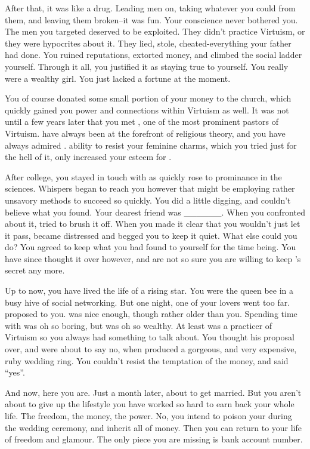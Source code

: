 \documentclass[char]{guildcamp1}
\begin{document}
After that, it was like a drug. Leading men on, taking whatever you could from them, and leaving them broken--it was fun. Your conscience never bothered you. The men you targeted deserved to be exploited. They didn't practice Virtuism, or they were hypocrites about it. They lied, stole, cheated-everything your father had done. You ruined reputations, extorted money, and climbed the social ladder yourself. Through it all, you justified it as staying true to yourself. You really were a wealthy girl. You just lacked a fortune at the moment.  

You of course donated some small portion of your money to the church, which quickly gained you power and connections within Virtuism as well. It was not until a few years later that you met \cPastor{}, one of the most prominent pastors of Virtuism.  have always been at the forefront of religious theory, and you have always admired .  ability to resist your feminine charms, which you tried just for the hell of it, only increased your esteem for \cPastor. 

After college, you stayed in touch with \cRival{} as  quickly rose to prominance in the sciences. Whispers began to reach you however that \cRival{} might be employing rather unsavory methods to succeed so quickly. You did a little digging, and couldn't believe what you found. Your dearest friend was ______. When you confronted  about it,  tried to brush it off. When you made it clear that you wouldn't just let it pass, \cRival{} became distressed and begged you to keep it quiet.  What else could you do? You agreed to keep what you had found to yourself for the time being. You have since thought it over however, and are not so sure you are willing to keep \cRival{}'s secret any more.

Up to now, you have lived the life of a rising star. You were the queen bee in a busy hive of social networking. But one night, one of your lovers went too far. \cGroom{} proposed to you.  was nice enough, though rather older than you. Spending time with  was oh so boring, but  was oh so wealthy. At least  was  a practicer of Virtuism so you always had something to talk about. You thought his proposal over, and were about to say no, when  produced a gorgeous, and very expensive, ruby wedding ring. You couldn't resist the temptation of the money, and said ``yes''.

And now, here you are. Just a month later, about to get married. But you aren't about to give up the lifestyle you have worked so hard to earn back your whole life. The freedom, the money, the power. No, you intend to poison your   during the wedding ceremony, and inherit all of  money. Then you can return to your life of freedom and glamour.  The only piece you are missing is  bank account number. 
\end{document}
